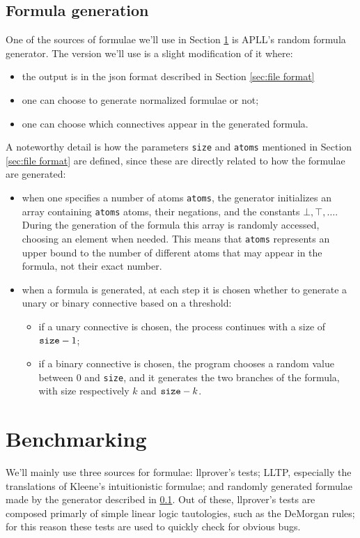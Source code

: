\subsection{Formula generation}\label{sec:formula generator}
One of the sources of formulae we'll use in Section \ref{sec:benchmarking} is APLL's random formula generator.
The version we'll use is a slight modification of it where:
\begin{itemize}
	\item the output is in the json format described in Section \ref{sec:file format}
	\item one can choose to generate normalized formulae or not;
	\item one can choose which connectives appear in the generated formula.
\end{itemize}
A noteworthy detail is how the parameters \texttt{size} and \texttt{atoms} mentioned in Section \ref{sec:file format} are defined, since these are directly related to how the formulae are generated:
\begin{itemize}
	\item when one specifies a number of atoms \texttt{atoms}, the generator initializes an array containing \texttt{atoms} atoms, their negations, and the constants $\bot, \top, \dots$.
		During the generation of the formula this array is randomly accessed, choosing an element when needed.
		This means that \texttt{atoms} represents an upper bound to the number of different atoms that may appear in the formula, not their exact number.
	\item when a formula is generated, at each step it is chosen whether to generate a unary or binary connective based on a threshold:
		\begin{itemize}
			\item if a unary connective is chosen, the process continues with a size of $\text{\texttt{size}} - 1$;
			\item if a binary connective is chosen, the program chooses a random value between 0 and \texttt{size}, and it generates the two branches of the formula, with size respectively $k$ and $\text{\texttt{size}} - k$.
		\end{itemize}
\end{itemize}

\section{Benchmarking}\label{sec:benchmarking}
We'll mainly use three sources for formulae: llprover's tests; LLTP, especially the translations of Kleene's intuitionistic formulae; and randomly generated formulae made by the generator described in \ref{sec:formula generator}.
Out of these, llprover's tests are composed primarly of simple linear logic tautologies, such as the DeMorgan rules; for this reason these tests are used to quickly check for obvious bugs.

